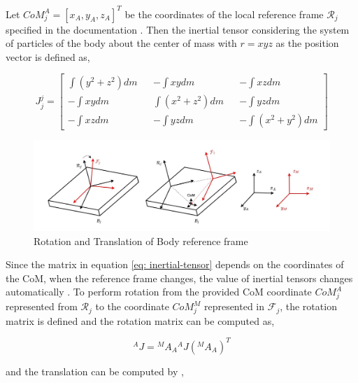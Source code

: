 Let $CoM_j^A = [x_A, y_A, z_A]^T$ be the coordinates of the local reference frame $\mathcal{R}_j$ specified in the documentation \cite{aldebaran-masses}. Then the inertial tensor
considering the system of particles of the body about the center of mass with $r=xyz$ as the position vector is defined as,

\begin{equation}
    \label{eq: inertial-tensor}
    J_j^j = \begin{bmatrix}
        \int(y^2 + z^2)dm && -\int xydm && -\int xzdm \\
        -\int xydm && \int (x^2 + z^2)dm && -\int yz dm \\
        -\int xz dm && -\int yz dm && -\int(x^2 + y^2) dm
    \end{bmatrix} 
\end{equation}

\begin{figure}[h!]
    \centering
    \includegraphics[scale=0.35]{images/flowchart-transformation-frames.jpg}\hfill
    \caption{Rotation and Translation of Body reference frame}\hfill
    \label{fig: body-frame-transformation}
\end{figure}

Since the matrix in equation \ref{eq: inertial-tensor} depends on the coordinates of the CoM, when the reference frame changes, the value of inertial tensors changes automatically \cite{karthikmunirathinam}.
To perform rotation from the provided CoM coordinate $CoM_j^A$ represented from $\mathcal{R}_j$ to the coordinate $CoM_j^M$ represented in $\mathcal{F}_j$, the rotation matrix is defined and the rotation matrix
can be computed as,

\begin{equation}
    \label{eq: rotation-frame}
    ^AJ = {^M}A_A{^A}J({^M}A_A)^T
\end{equation}

and the translation can be computed by \cite{karthikmunirathinam},

